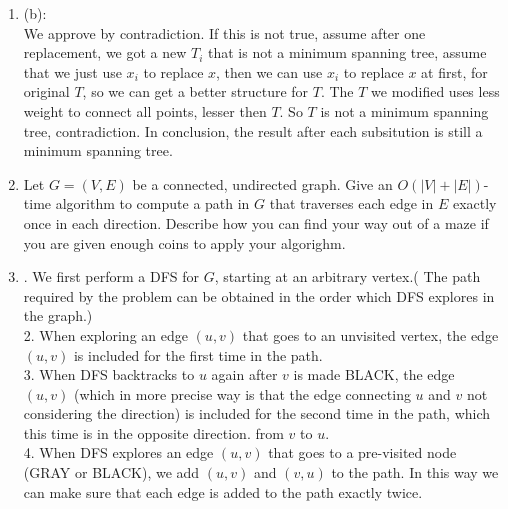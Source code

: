 \documentclass[12pt,a4paper]{article}
\makeatletter
\newtheorem*{solution}{Solution}
\theoremstyle{definition}
\renewenvironment{solution}[1][Solution] {\par\pushQED{\qed}\normalfont\topsep6\p@\@plus6\p@\relax\trivlist\item[\hskip\labelsep\bfseries#1\@addpunct{.}]\ignorespaces}{\popQED\endtrivlist\@endpefalse} \makeatother
\makeatother
\begin{document}
\begin{enumerate}
\begin{solution}
	
	(b):\\
	We approve by contradiction. If this is not true, assume after one replacement, we got a new $T_i$ that is not a minimum spanning tree, assume that we just use $x_i$ to replace $x$, then we can use $x_i$ to replace $x$ at first, for original $T$, so we can get a better structure for $T$. The $T$ we modified uses less weight to connect all points, lesser then $T$. So $T$ is not a minimum spanning tree, contradiction. In conclusion, the result after each subsitution is still a minimum spanning tree.
	
	
	\end{solution}
	
	
    \item Let $G=(V,E)$ be a connected, undirected graph. Give an $O(|V|+|E|)$-time algorithm
    to compute a path in $G$ that traverses each edge in $E$ exactly once in each direction. Describe how you can find your way out of a maze if you are given enough coins to apply your algorighm.

    \begin{solution}
    1. We first perform a DFS for $G$, starting at an arbitrary vertex.( The path required by the problem can be obtained in the order which DFS 
    explores in the graph.) \\
    2. When exploring an edge $\left(u, v\right)$ that goes to an unvisited vertex, the edge $\left(u, v\right)$ is included for the first time in the path. \\
    3. When DFS backtracks to $u$ again after $v$ is made BLACK, the edge $\left(u, v\right)$ (which in more precise way is that the edge connecting $u$ and $v$ not considering the direction) is included for the second time in the path, which this time is in the opposite direction. from $v$ to $u$. \\
    4. When DFS explores an edge $\left(u, v\right)$ that goes to a pre-visited node (GRAY or BLACK), we add $\left(u, v\right)$ and $\left(v, u\right)$ to the path. In this way we can make sure that each edge is added to the path exactly twice. \\
    
    
    \end{solution}
    
    
    

\end{enumerate}
\end{document}
